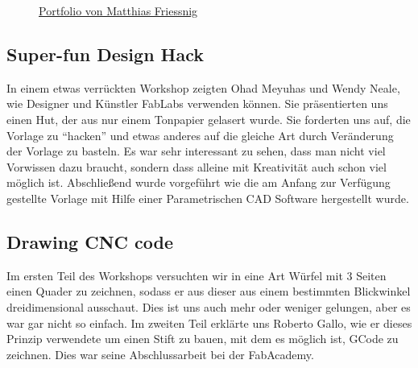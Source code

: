 \documentclass{\basedir/fablab-document}
\begin{document}
\begin{figure}[htbp]
	\noindent{}
	\caption{\href{http://fablab.tugraz.at/portfolio-item/making-fablabs-smarter-through-sensors-and-cloud-based-analysis/}{Portfolio von Matthias Friessnig}}
	\label{sensors}
\end{figure}

\subsection*{Super-fun Design Hack}\label{super-fun-design-hack}

In einem etwas verrückten Workshop zeigten Ohad Meyuhas und Wendy Neale,
wie Designer und Künstler FabLabs verwenden können. Sie präsentierten
uns einen Hut, der aus nur einem Tonpapier gelasert wurde. Sie forderten
uns auf, die Vorlage zu ``hacken'' und etwas anderes auf die gleiche Art
durch Veränderung der Vorlage zu basteln. Es war sehr interessant zu
sehen, dass man nicht viel Vorwissen dazu braucht, sondern dass alleine
mit Kreativität auch schon viel möglich ist. Abschließend wurde
vorgeführt wie die am Anfang zur Verfügung gestellte Vorlage mit Hilfe
einer Parametrischen CAD Software hergestellt wurde.

\subsection*{Drawing CNC code}\label{drawing-cnc-code}

Im ersten Teil des Workshops versuchten wir in eine Art Würfel mit 3
Seiten einen Quader zu zeichnen, sodass er aus dieser aus einem
bestimmten Blickwinkel dreidimensional ausschaut. Dies ist uns auch mehr
oder weniger gelungen, aber es war gar nicht so einfach. Im zweiten Teil
erklärte uns Roberto Gallo, wie er dieses Prinzip verwendete um einen
Stift zu bauen, mit dem es möglich ist, GCode zu zeichnen. Dies war
seine Abschlussarbeit bei der FabAcademy.
\end{document}
